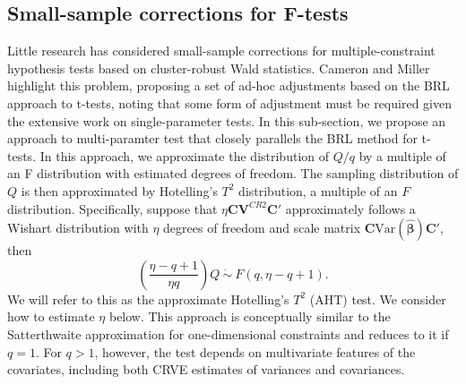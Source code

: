 \documentclass[12pt]{article}
\newcommand{\Var}{\text{Var}}
\newcommand{\bm}{\mathbf}
\newcommand{\bs}{\boldsymbol}
\begin{document}

\subsection{Small-sample corrections for F-tests}

Little research has considered small-sample corrections for multiple-constraint hypothesis tests based on cluster-robust Wald statistics.
Cameron and Miller highlight this problem, proposing a set of ad-hoc adjustments based on the BRL approach to t-tests, noting that some form of adjustment must be required given the extensive work on single-parameter tests.
In this sub-section, we propose an approach to multi-paramter test that closely parallels the BRL method for t-tests.
In this approach, we approximate the distribution of $Q / q$ by a multiple of an F distribution with estimated degrees of freedom. 
The sampling distribution of $Q$ is then approximated by Hotelling's $T^2$ distribution, a multiple of an $F$ distribution. 
Specifically, suppose that $\eta \bm{C}\bm{V}^{CR2} \bm{C}'$ approximately follows a Wishart distribution with $\eta$ degrees of freedom and scale matrix $\bm{C} \Var\left(\bs{\hat\beta}\right)\bm{C}'$, then 
\begin{equation}
\label{eq:AHT}
\left(\frac{\eta - q + 1}{\eta q}\right) Q \ \dot\sim \ F(q, \eta - q + 1).
\end{equation}
We will refer to this as the approximate Hotelling's $T^2$ (AHT) test.
We consider how to estimate $\eta$ below.
This approach is conceptually similar to the Satterthwaite approximation for one-dimensional constraints and reduces to it if $q = 1$. 
For $q > 1$, however, the test depends on multivariate features of the covariates, including both CRVE estimates of variances and covariances. 
\end{document}
